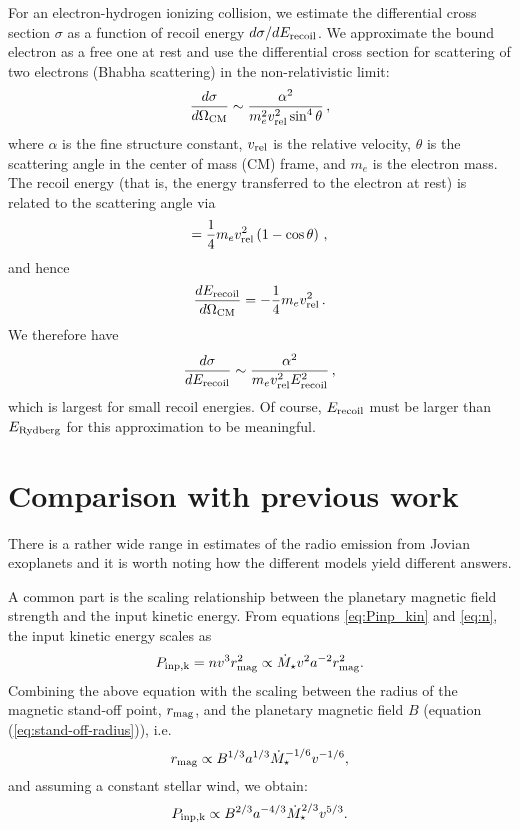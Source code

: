 \documentclass[iop,numberedappendix,apj]{emulateapj}
\begin{document}
For an electron-hydrogen ionizing collision, we estimate the differential cross section $\sigma$ as a function of recoil energy $d\sigma / dE_{\rm recoil}$.
We approximate the bound electron as a free one at rest and use the differential cross section for scattering of two electrons (Bhabha scattering) in the non-relativistic limit:
\begin{equation}
\label{eq:dsig/dOmeg} \frac{d\sigma}{d\Omega_{\rm CM}} \sim \frac{\alpha^2}{m_e^2 v_{\rm rel}^2 \sin^4 \theta} \, ,
\end{equation}
where $\alpha$ is the fine structure constant, $v_{\rm rel}$ is the relative velocity, $\theta$ is the scattering angle in the center of mass (CM) frame, and $m_e$ is the electron mass.
The recoil energy (that is, the energy transferred to the electron at rest) is related to the scattering angle via
\begin{equation}
  \label{eq:Erec} = \frac{1}{4} m_e v_{\rm rel}^2 \left( 1 - \cos \theta \right) \, ,
\end{equation}
and hence
\begin{equation}
  \label{eq:dErec/dOmeg} \frac{dE_{\rm recoil}}{d\Omega_{\rm CM}} = -\frac{1}{4} m_e v_{\rm rel}^2 \, .
\end{equation}
We therefore have
\begin{equation}
  \label{eq:dsig/dErec} \frac{d\sigma}{dE_{\rm recoil}} \sim \frac{\alpha^2}{m_e v_{\rm rel}^2 E_{\rm recoil}^2} \, ,
\end{equation}
which is largest for small recoil energies.
Of course, $E_{\rm recoil}$ must be larger than $E_{\rm Rydberg}$ for this approximation to be meaningful. 


\section{Comparison with previous work}
\label{sec:AppendixA}

There is a rather wide range in estimates of the radio emission from Jovian exoplanets and it is worth noting how the different models yield different answers. 

A common part is the scaling relationship between the planetary magnetic field strength and the input kinetic energy.
From equations \ref{eq:Pinp_kin} and \ref{eq:n}, the input kinetic energy scales as
\begin{equation}
P_{\rm inp,k}=nv^3 r_{\rm mag}^2 \propto \dot M_{\star} v^2 a^{-2} r_{\rm mag}^2.
\end{equation}
Combining the above equation with the scaling between the radius of the magnetic stand-off point, $r_{\rm mag}$, and the planetary magnetic field $B$ (equation (\ref{eq:stand-off-radius})), i.e.\
\begin{equation}
r_{\rm mag} \propto B^{1/3} a^{1/3} \dot M_{\star }^{-1/6} v^{-1/6}, 
\end{equation}
and assuming a constant stellar wind, we obtain:
\begin{equation}
P_{\rm inp, k} \propto B^{2/3} a^{-4/3} \dot M_{\star }^{2/3} v^{5/3}.
\end{equation}
\end{document}
